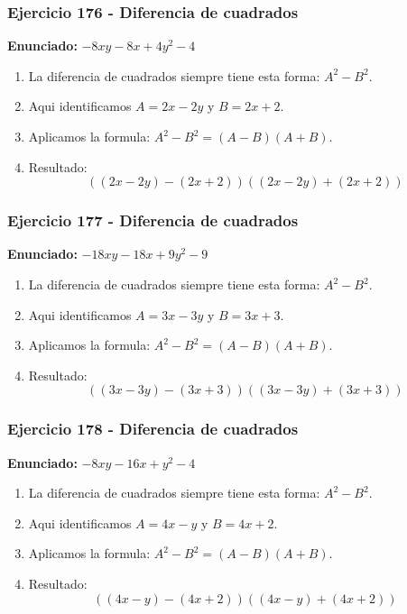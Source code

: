 \documentclass[11pt,a4paper]{article}
\begin{document}
\vspace{0.2cm}
\subsubsection*{Ejercicio 176 - Diferencia de cuadrados}
\textbf{Enunciado:} $ - 8 x y - 8 x + 4 y^{2} - 4 $\par
\begin{enumerate}[leftmargin=2em]
\item La diferencia de cuadrados siempre tiene esta forma: \(A^2-B^2\).
\item Aqui identificamos \(A=2 x - 2 y\) y \(B=2 x + 2\).
\item Aplicamos la formula: \(A^2-B^2=(A-B)(A+B)\).
\item Resultado: \[\boxed{\left(\left(2 x - 2 y\right)-\left(2 x + 2\right)\right)\left(\left(2 x - 2 y\right)+\left(2 x + 2\right)\right)}\]
\end{enumerate}

\vspace{0.2cm}
\subsubsection*{Ejercicio 177 - Diferencia de cuadrados}
\textbf{Enunciado:} $ - 18 x y - 18 x + 9 y^{2} - 9 $\par
\begin{enumerate}[leftmargin=2em]
\item La diferencia de cuadrados siempre tiene esta forma: \(A^2-B^2\).
\item Aqui identificamos \(A=3 x - 3 y\) y \(B=3 x + 3\).
\item Aplicamos la formula: \(A^2-B^2=(A-B)(A+B)\).
\item Resultado: \[\boxed{\left(\left(3 x - 3 y\right)-\left(3 x + 3\right)\right)\left(\left(3 x - 3 y\right)+\left(3 x + 3\right)\right)}\]
\end{enumerate}

\vspace{0.2cm}
\subsubsection*{Ejercicio 178 - Diferencia de cuadrados}
\textbf{Enunciado:} $ - 8 x y - 16 x + y^{2} - 4 $\par
\begin{enumerate}[leftmargin=2em]
\item La diferencia de cuadrados siempre tiene esta forma: \(A^2-B^2\).
\item Aqui identificamos \(A=4 x - y\) y \(B=4 x + 2\).
\item Aplicamos la formula: \(A^2-B^2=(A-B)(A+B)\).
\item Resultado: \[\boxed{\left(\left(4 x - y\right)-\left(4 x + 2\right)\right)\left(\left(4 x - y\right)+\left(4 x + 2\right)\right)}\]
\end{enumerate}
\end{document}
